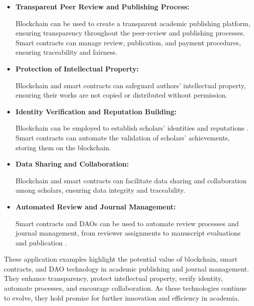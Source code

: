 \documentclass[lettersize,journal]{IEEEtran}
\begin{document}
\begin{itemize}
  \item \textbf{Transparent Peer Review and Publishing Process:} 
  
  Blockchain can be used to create a transparent academic publishing platform, ensuring transparency throughout the peer-review and publishing processes.\cite{nakamoto2008bitcoin} Smart contracts can manage review, publication, and payment procedures, ensuring traceability and fairness.

  \item \textbf{Protection of Intellectual Property:}
  
  Blockchain and smart contracts can safeguard authors' intellectual property, ensuring their works are not copied or distributed without permission.
  
  \item \textbf{Identity Verification and Reputation Building:} 
  
  Blockchain can be employed to establish scholars' identities and reputations \cite{radziwill2018blockchain}. Smart contracts can automate the validation of scholars' achievements, storing them on the blockchain.
  
  \item \textbf{Data Sharing and Collaboration:} 
  
  Blockchain and smart contracts can facilitate data sharing and collaboration among scholars, ensuring data integrity and traceability.
  
  \item \textbf{Automated Review and Journal Management:} 
  
  Smart contracts and DAOs can be used to automate review processes and journal management, from reviewer assignments to manuscript evaluations and publication \cite{praitheeshan2019security}.
\end{itemize}

These application examples highlight the potential value of blockchain, smart contracts, and DAO technology in academic publishing and journal management. They enhance transparency, protect intellectual property, verify identity, automate processes, and encourage collaboration. As these technologies continue to evolve, they hold promise for further innovation and efficiency in academia.
\end{document}
